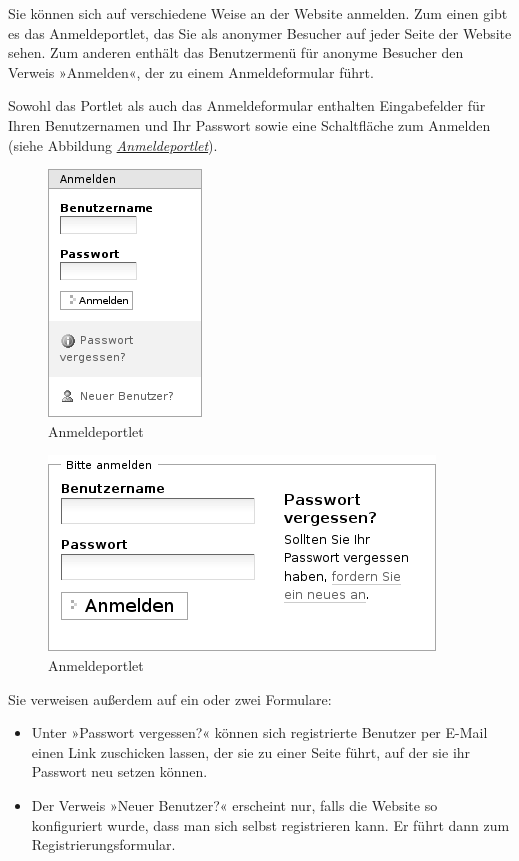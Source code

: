 \documentclass[a4paper,12pt,ngerman]{manual}
\begin{document}
Sie können sich auf verschiedene Weise an der Website anmelden. Zum
einen gibt es das Anmeldeportlet, das Sie als anonymer Besucher auf
jeder Seite der Website sehen. Zum anderen enthält das Benutzermenü
für anonyme Besucher den Verweis »Anmelden«, der zu einem
Anmeldeformular führt.

Sowohl das Portlet als auch das Anmeldeformular enthalten Eingabefelder für
Ihren Benutzernamen und Ihr Passwort sowie eine Schaltfläche zum Anmelden
(siehe Abbildung \hyperlink{fig-portlet-login}{\emph{Anmeldeportlet}}).
\hypertarget{fig-portlet-login}{}\begin{figure}[htbp]
\centering

\includegraphics{portlet-login.png}
\caption{Anmeldeportlet}\end{figure}
\hypertarget{fig-anmeldeformular}{}\begin{figure}[htbp]
\centering

\includegraphics{anmeldeformular.png}
\caption{Anmeldeportlet}\end{figure}

Sie verweisen außerdem auf ein oder zwei Formulare:
\begin{itemize}
\item {} 
Unter »Passwort vergessen?« können sich registrierte Benutzer per
E-Mail einen Link zuschicken lassen, der sie zu einer Seite führt, auf der
sie ihr Passwort neu setzen können.

\item {} 
Der Verweis »Neuer Benutzer?« erscheint nur, falls die Website so
konfiguriert wurde, dass man sich selbst registrieren kann. Er führt
dann zum Registrierungsformular.

\end{itemize}
\hypertarget{sec-anmelden-mit-openid}{}
\end{document}
